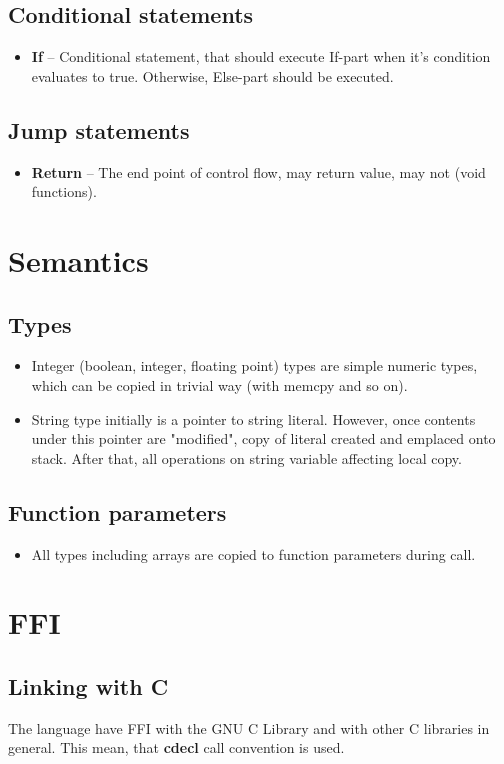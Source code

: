 \documentclass{article}
\begin{document}
        \subsection{Conditional statements}
            \begin{itemize}
                \item \textbf{If} -- Conditional statement, that should execute
                      If-part when it's condition evaluates to true. Otherwise, Else-part
                      should be executed.
            \end{itemize}

        \subsection{Jump statements}
            \begin{itemize}
                \item \textbf{Return} -- The end point of control flow, may return
                      value, may not (void functions).
            \end{itemize}

    \section{Semantics}
        \upshape

        \subsection{Types}
            \begin{itemize}
                \item Integer (boolean, integer, floating point) types are simple
                      numeric types, which can be copied in trivial way (with
                      memcpy and so on).

                  \item String type initially is a pointer to string literal. However, once
                        contents under this pointer are "modified", copy of literal
                        created and emplaced onto stack. After that, all operations on
                        string variable affecting local copy.
            \end{itemize}

        \subsection{Function parameters}
            \begin{itemize}
                \item All types including arrays are copied to function parameters
                      during call.
            \end{itemize}

    \section{FFI}
        \subsection{Linking with C}
            The language have FFI with the GNU C Library and with other C
            libraries in general. This mean, that \textbf{cdecl} call convention is used.
\end{document}
